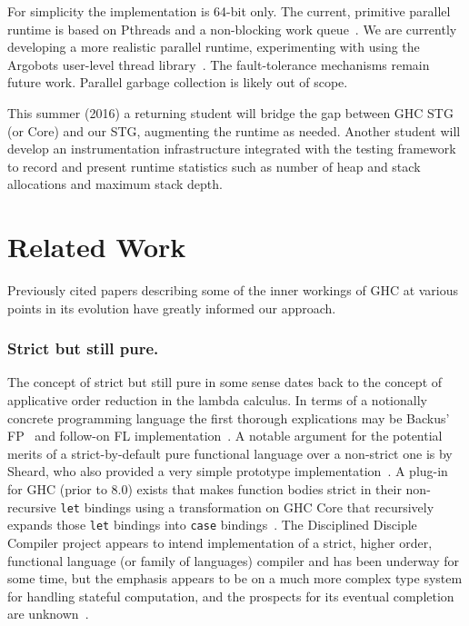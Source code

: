 \documentclass{llncs}
\begin{document}
For simplicity the implementation is 64-bit only.
%
The current, primitive parallel runtime is based on Pthreads and a non-blocking
work queue~\cite{Michael:1996}.  We are currently developing a more realistic
parallel runtime, experimenting with using the Argobots user-level thread library~\cite{Seo:2015}.
%
The fault-tolerance mechanisms remain future work.
%
Parallel garbage collection is likely out of scope.

This summer (2016) a returning student will bridge the gap between GHC STG (or
Core) and our STG, augmenting the runtime as needed.  Another student will
develop an instrumentation infrastructure integrated with the testing
framework to record and present runtime statistics such as number of heap and
stack allocations and maximum stack depth.




\section{Related Work}

Previously cited papers describing some of the inner workings of GHC at
various points in its evolution have greatly informed our approach.

\subsubsection{Strict but still pure.}
The concept of strict but still pure in some sense dates back to the concept
of applicative order reduction in the lambda calculus.  In terms of a
notionally concrete programming language the first thorough explications may
be Backus' FP~\cite{Backus:1978} and follow-on FL
implementation~\cite{AikenFL,FLreport89}.
%
A notable argument for the potential merits of a strict-by-default
pure functional language over a non-strict one is by Sheard, who also provided
a very simple prototype implementation~\cite{Sheard:2003}.
%
A plug-in for GHC (prior to 8.0) exists that makes function bodies strict in
their non-recursive \texttt{let} bindings using a transformation on GHC Core
that recursively expands those \texttt{let} bindings into \texttt{case}
bindings~\cite{Bolingbroke:2008,strict-ghc-plugin}.
%
The Disciplined Disciple Compiler project appears to intend implementation of
a strict, higher order, functional language (or family of languages) compiler
and has been underway for some time, but the emphasis appears to be on a much
more complex type system for handling stateful computation, and the prospects
for its eventual completion are unknown~\cite{disciplined-disciple}.
\end{document}

